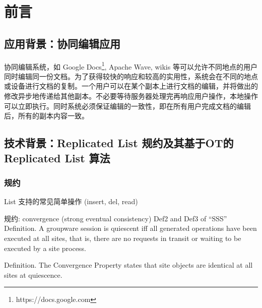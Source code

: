 \chapter{前言}
\section{应用背景：协同编辑应用}
	\par 协同编辑系统，如 Google Docs\footnote{https://docs.google.com}, Apache Wave, wikis 等可以允许不同地点的用户同时编辑同一份文档。为了获得较快的响应和较高的实用性，系统会在不同的地点或设备进行文档的复制。一个用户可以在某个副本上进行文档的编辑，并将做出的修改异步地传递给其他副本。不必要等待服务器处理完再响应用户操作，本地操作可以立即执行。同时系统必须保证编辑的一致性，即在所有用户完成文档的编辑后，所有的副本内容一致。

\section{技术背景：Replicated List 规约及其基于OT的 Replicated List 算法}

\subsection{规约}
List 支持的常见简单操作 (insert, del, read)

规约: convergence (strong eventual consistency)
Def2 and Def3 of ``SSS''
Definition. A groupware session is quiescent iff all generated
operations have been executed at all sites, that is, there
are no requests in transit or waiting to be executed by a
site process.\cite{ellis1989concurrency}

Definition. The Convergence Property states that site objects
are identical at all sites at quiescence.\cite{ellis1989concurrency}

